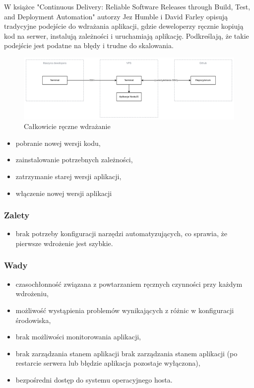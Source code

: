 \documentclass{article}
\begin{document}
W książce "Continuous Delivery: Reliable Software Releases through Build, Test, and Deployment Automation" \cite{continuousDelivery} autorzy Jez Humble i David Farley opisują tradycyjne podejście do wdrażania aplikacji, gdzie deweloperzy ręcznie kopiują kod na serwer, instalują zależności i uruchamiają aplikację. Podkreślają, że takie podejście jest podatne na błędy i trudne do skalowania.

\begin{figure}[H]
    \centering
    \includegraphics[width=1\linewidth]{reczne_wdrazanie.png}
    \caption{Całkowicie ręczne wdrażanie}
    \label{fig:enter-label}
\end{figure}

\begin{itemize}
    \item pobranie nowej wersji kodu,
    \item zainstalowanie potrzebnych zależności,
    \item zatrzymanie starej wersji aplikacji,
    \item włączenie nowej wersji aplikacji
\end{itemize}

\subsubsection{Zalety}

\begin{itemize}
    \item brak potrzeby konfiguracji narzędzi automatyzujących, co sprawia, że pierwsze wdrożenie jest szybkie.
\end{itemize}

\subsubsection{Wady}

\begin{itemize}
    \item czasochłonność związana z powtarzaniem ręcznych czynności przy każdym wdrożeniu,
    \item możliwość wystąpienia problemów wynikających z różnic w konfiguracji środowiska,
    \item brak możliwości monitorowania aplikacji,
    \item brak zarządzania stanem aplikacji brak zarządzania stanem aplikacji (po restarcie serwera lub błędzie aplikacja pozostaje wyłączona),
    \item bezpośredni dostęp do systemu operacyjnego hosta.
\end{itemize}
\end{document}

